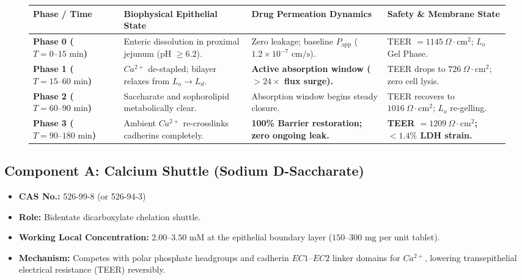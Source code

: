 \documentclass[10pt,twocolumn,letterpaper]{article}
\begin{document}
\begin{figure}[t!]
\centering
\begin{tcolorbox}[colback=white,colframe=mgpblue,title=\textbf{Figure 1: Pharmacokinetic Tri-Component Permeation Timeline ($T = 0 \text{ to } 180\text{ min}$)},fonttitle=\small\bfseries]
\centering
\small
\begin{tabularx}{\textwidth}{|l|X|X|l|}
\hline
\rowcolor{tableheader}
\textbf{Phase / Time} & \textbf{Biophysical Epithelial State} & \textbf{Drug Permeation Dynamics} & \textbf{Safety \& Membrane State} \\
\hline
\textbf{Phase 0 ($T = 0\text{--}15\text{ min}$)} & Enteric dissolution in proximal jejunum (pH $\ge 6.2$). & Zero leakage; baseline $P_{\text{app}}$ ($1.2\times 10^{-7}\text{ cm/s}$). & TEER $= 1145\ \Omega\cdot\text{cm}^2$; $L_o$ Gel Phase. \\
\hline
\textbf{Phase 1 ($T = 15\text{--}60\text{ min}$)} & $Ca^{2+}$ de-stapled; bilayer relaxes from $L_o \rightarrow L_d$. & \textbf{Active absorption window ($>24\times$ flux surge).} & TEER drops to $726\ \Omega\cdot\text{cm}^2$; zero cell lysis. \\
\hline
\textbf{Phase 2 ($T = 60\text{--}90\text{ min}$)} & Saccharate and sophorolipid metabolically clear. & Absorption window begins steady closure. & TEER recovers to $1016\ \Omega\cdot\text{cm}^2$; $L_o$ re-gelling. \\
\hline
\textbf{Phase 3 ($T = 90\text{--}180\text{ min}$)} & Ambient $Ca^{2+}$ re-crosslinks cadherins completely. & \textbf{100\% Barrier restoration; zero ongoing leak.} & \textbf{TEER $= 1209\ \Omega\cdot\text{cm}^2$; $<1.4\%$ LDH strain.} \\
\hline
\end{tabularx}
\end{tcolorbox}
\end{figure}

\subsection{Component A: Calcium Shuttle (Sodium D-Saccharate)}
\begin{itemize}[noitemsep]
    \item \textbf{CAS No.:} 526-99-8 (or 526-94-3)
    \item \textbf{Role:} Bidentate dicarboxylate chelation shuttle.
    \item \textbf{Working Local Concentration:} $2.00\text{--}3.50\text{ mM}$ at the epithelial boundary layer ($150\text{--}300\text{ mg}$ per unit tablet).
    \item \textbf{Mechanism:} Competes with polar phosphate headgroups and cadherin $EC1\text{--}EC2$ linker domains for $Ca^{2+}$, lowering transepithelial electrical resistance (TEER) reversibly.
\end{itemize}
\end{document}
